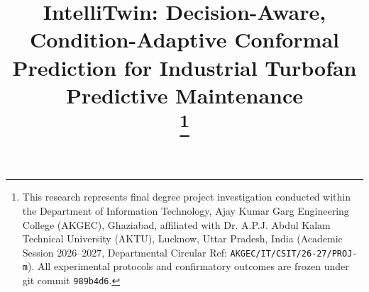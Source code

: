 \documentclass[conference]{IEEEtran}
\begin{document}
\title{IntelliTwin: Decision-Aware, Condition-Adaptive Conformal Prediction for Industrial Turbofan Predictive Maintenance\\
\thanks{This research represents final degree project investigation conducted within the Department of Information Technology, Ajay Kumar Garg Engineering College (AKGEC), Ghaziabad, affiliated with Dr. A.P.J. Abdul Kalam Technical University (AKTU), Lucknow, Uttar Pradesh, India (Academic Session 2026--2027, Departmental Circular Ref: \texttt{AKGEC/IT/CSIT/26-27/PROJ-m}). All experimental protocols and confirmatory outcomes are frozen under git commit \texttt{989b4d6}.}
}

\author{
}

\maketitle
\end{document}
